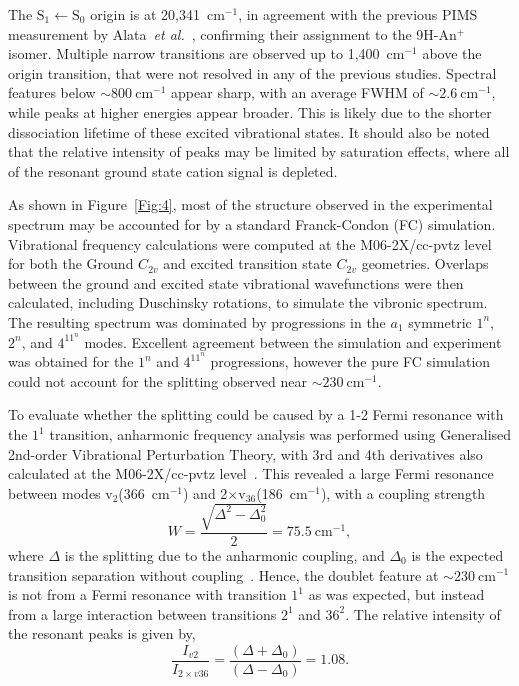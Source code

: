 \documentclass[journal=jpcafh,manuscript=article,layout=onecolumn, 12pt]{achemso}
\begin{document}
The $\text{S}_1\leftarrow \text{S}_0$ origin is at 20,341~cm$^{-1}$, in agreement with the previous PIMS measurement by Alata~\emph{et al.}~\cite{ala10}, confirming their assignment to the 9H-An$^+$ isomer. Multiple narrow transitions are observed up to 1,400~cm$^{-1}$ above the origin transition, that were not resolved in any of the previous studies. Spectral features below $\sim800~$cm$^{-1}$ appear sharp, with an average FWHM of $\sim 2.6~$cm$^{-1}$, while peaks at higher energies appear broader. This is likely due to the shorter dissociation lifetime of these excited vibrational states. It should also be noted that the relative intensity of peaks may be limited by saturation effects, where all of the resonant ground state cation signal is depleted.

As shown in Figure~\ref{Fig:4}, most of the structure observed in the experimental spectrum may be accounted for by a standard Franck-Condon (FC) simulation. Vibrational frequency calculations were computed at the M06-2X/cc-pvtz level for both the Ground $C_{2v}$ and excited transition state $C_{2v}$ geometries. Overlaps between the ground and excited state vibrational wavefunctions were then calculated, including Duschinsky rotations, to simulate the vibronic spectrum. The resulting spectrum was dominated by progressions in the $a_1$ symmetric $1^n$, $2^n$, and $4^11^n$ modes. Excellent agreement between the simulation and experiment was obtained for the $1^n$ and $4^11^n$ progressions, however the pure FC simulation could not account for the splitting observed near $\sim230~$cm$^{-1}$. 

To evaluate whether the splitting could be caused by a 1-2 Fermi resonance with the $1^1$ transition, anharmonic frequency analysis was performed using Generalised 2nd-order Vibrational Perturbation Theory, with 3rd and 4th derivatives also calculated at the M06-2X/cc-pvtz level~\cite{bio12}. This revealed a large Fermi resonance between modes v$_2$(366~cm$^{-1}$) and 2$\times$v$_{36}$(186~cm$^{-1}$), with a coupling strength
\begin{equation}
W = \frac{\sqrt{\Delta^2-\Delta_0^2}}{2} =75.5~\text{cm}^{-1},
\label{eq:1}
\end{equation} 
where $\Delta$ is the splitting due to the anharmonic coupling, and $\Delta_0$ is the expected transition separation without coupling~\cite{bur10}. Hence, the doublet feature at $\sim230~$cm$^{-1}$ is not from a Fermi resonance with transition $1^1$ as was expected, but instead from a large interaction between transitions $2^1$ and $36^2$. The relative intensity of the resonant peaks is given by,
\begin{equation}
\frac{I_{v2}}{I_{2\times v36}} = \frac{\left(\Delta+\Delta_0\right)}{\left(\Delta-\Delta_0\right)}=1.08.
\label{eq:2}
\end{equation}
\end{document}

